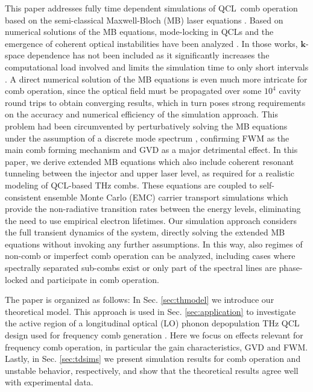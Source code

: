 \documentclass[10pt,letterpaper]{article}%
\def\bm{\mathbf}
\begin{document}
This paper addresses fully time dependent simulations of QCL\ comb operation
based on the semi-classical Maxwell-Bloch (MB) laser equations
\cite{boyd2003nonlinear}. Based on numerical solutions of the MB equations,
mode-locking in QCLs and the emergence of coherent optical instabilities have
been analyzed
\cite{wang2007coherent,gordon2008multimode,gkortsas2010dynamics,talukder2010self,wang2015active,vukovic2016multimode}. In those works, $\bm{k}$-space dependence has not been included as it significantly increases the computational load involved and limits the simulation time to only short intervals \cite{weber2006theory}. A direct numerical solution of the MB equations is even much more intricate for
comb operation, since the optical field must be propagated over some $10^{4}$
cavity round trips to obtain converging results, which in turn poses strong
requirements on the accuracy and numerical efficiency of the simulation
approach. This problem had been circumvented by perturbatively solving the MB
equations under the assumption of a discrete mode spectrum
\cite{khurgin2014coherent,villares2015quantum}, confirming FWM as the main
comb forming mechanism and GVD as a major detrimental effect. In this paper,
we derive extended MB equations which also include coherent resonant tunneling
between the injector and upper laser level, as required for a realistic
modeling of QCL-based THz combs. These equations are coupled to
self-consistent ensemble Monte Carlo (EMC) carrier transport simulations which
provide the non-radiative transition rates between the energy levels,
eliminating the need to use empirical electron lifetimes. Our simulation
approach considers the full transient dynamics of the system, directly solving
the extended MB equations without invoking any further assumptions. In this
way, also regimes of non-comb or imperfect comb operation can be analyzed,
including cases where spectrally separated sub-combs exist or only part of the
spectral lines are phase-locked and participate in comb operation.

The paper is organized as follows: In Sec. \ref{sec:thmodel} we introduce our
theoretical model. This approach is used in Sec. \ref{sec:application} to
investigate the active region of a longitudinal optical (LO) phonon
depopulation THz QCL design used for frequency comb generation
\cite{burghoff2014terahertz}. Here we focus on effects relevant for frequency
comb operation, in particular the gain characteristics, GVD and FWM. Lastly,
in Sec. \ref{sec:tdsims} we present simulation results for comb
operation and unstable behavior, respectively, and show that the theoretical
results agree well with experimental data.
\end{document}
